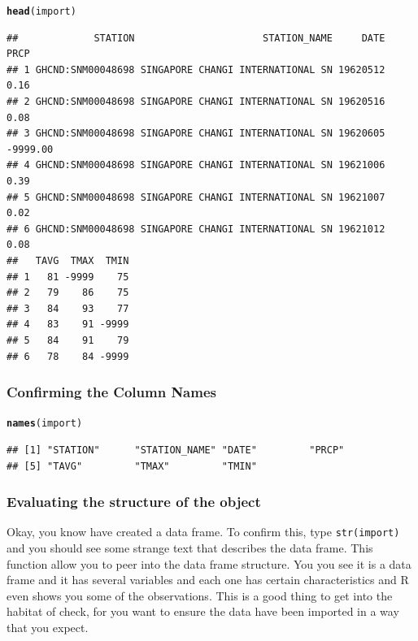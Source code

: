 \documentclass{article}\usepackage[]{graphicx}\usepackage[]{color}
\makeatletter
\newcommand{\hlstd}[1]{\textcolor[rgb]{0.345,0.345,0.345}{#1}}%
\newcommand{\hlkwd}[1]{\textcolor[rgb]{0.737,0.353,0.396}{\textbf{#1}}}%
\newenvironment{kframe}{%
 \def\at@end@of@kframe{}%
 \ifinner\ifhmode%
  \def\at@end@of@kframe{\end{minipage}}%
  \begin{minipage}{\columnwidth}%
 \fi\fi%
 \def\FrameCommand##1{\hskip\@totalleftmargin \hskip-\fboxsep
 \colorbox{shadecolor}{##1}\hskip-\fboxsep
     \hskip-\linewidth \hskip-\@totalleftmargin \hskip\columnwidth}%
 \MakeFramed {\advance\hsize-\width
   \@totalleftmargin\z@ \linewidth\hsize
   \@setminipage}}%
 {\par\unskip\endMakeFramed%
 \at@end@of@kframe}
\newenvironment{knitrout}{}{} %
\makeatother
\begin{document}
\begin{knitrout}
\color{fgcolor}\begin{kframe}
\begin{alltt}
\hlkwd{head}\hlstd{(import)}
\end{alltt}
\begin{verbatim}
##             STATION                      STATION_NAME     DATE     PRCP
## 1 GHCND:SNM00048698 SINGAPORE CHANGI INTERNATIONAL SN 19620512     0.16
## 2 GHCND:SNM00048698 SINGAPORE CHANGI INTERNATIONAL SN 19620516     0.08
## 3 GHCND:SNM00048698 SINGAPORE CHANGI INTERNATIONAL SN 19620605 -9999.00
## 4 GHCND:SNM00048698 SINGAPORE CHANGI INTERNATIONAL SN 19621006     0.39
## 5 GHCND:SNM00048698 SINGAPORE CHANGI INTERNATIONAL SN 19621007     0.02
## 6 GHCND:SNM00048698 SINGAPORE CHANGI INTERNATIONAL SN 19621012     0.08
##   TAVG  TMAX  TMIN
## 1   81 -9999    75
## 2   79    86    75
## 3   84    93    77
## 4   83    91 -9999
## 5   84    91    79
## 6   78    84 -9999
\end{verbatim}
\end{kframe}
\end{knitrout}

\subsubsection{Confirming the Column Names}

\begin{knitrout}
\color{fgcolor}\begin{kframe}
\begin{alltt}
\hlkwd{names}\hlstd{(import)}
\end{alltt}
\begin{verbatim}
## [1] "STATION"      "STATION_NAME" "DATE"         "PRCP"        
## [5] "TAVG"         "TMAX"         "TMIN"
\end{verbatim}
\end{kframe}
\end{knitrout}

\subsubsection{Evaluating the structure of the object}

Okay, you know have created a data frame. To confirm this, type \texttt{str(import)} and you should see some strange text that describes the data frame. This function allow you to peer into the data frame structure. You you see it is a data frame and it has several variables and each one has certain characteristics and R even shows you some of the observations. This is a good thing to get into the habitat of check, for you want to ensure the data have been imported in a way that you expect.
\end{document}

